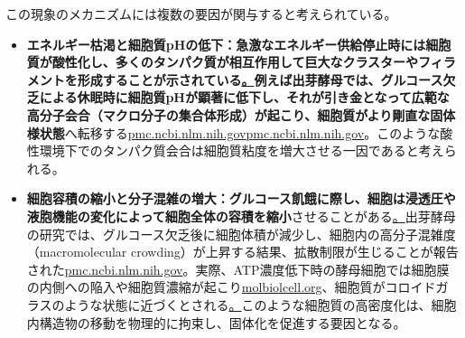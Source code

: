 この現象のメカニズムには複数の要因が関与すると考えられている。

\begin{itemize}
    \item \textbf{エネルギー枯渇と細胞質pHの低下：\textbf{急激なエネルギー供給停止時には細胞質が酸性化し、多くのタンパク質が相互作用して巨大なクラスターやフィラメントを形成することが示されている\href{https://pmc.ncbi.nlm.nih.gov/articles/PMC4850707/\#:~:text=it\%20to\%20be\%20associated\%20with,fluid\%20that\%20can\%20reversibly\%20transition}\href{https://pmc.ncbi.nlm.nih.gov/articles/PMC4850707/\#:~:text=Now\%2C\%20Munder\%20et\%20al,in\%20the\%20cytoplasm\%20becoming\%20stiffer}。例えば出芽酵母では、グルコース欠乏による休眠時に細胞質pHが顕著に低下し、それが引き金となって}広範な高分子会合（マクロ分子の集合体形成）\textbf{が起こり、細胞質が}より剛直な固体様状態}へ転移する\href{https://pmc.ncbi.nlm.nih.gov/articles/PMC4850707/\#:~:text=it\%20to\%20be\%20associated\%20with,fluid\%20that\%20can\%20reversibly\%20transition}{pmc.ncbi.nlm.nih.gov}\href{https://pmc.ncbi.nlm.nih.gov/articles/PMC4850707/\#:~:text=Now\%2C\%20Munder\%20et\%20al,in\%20the\%20cytoplasm\%20becoming\%20stiffer}{pmc.ncbi.nlm.nih.gov}。このような酸性環境下でのタンパク質会合は細胞質粘度を増大させる一因であると考えられる。
    \item \textbf{細胞容積の縮小と分子混雑の増大：\textbf{グルコース飢餓に際し、細胞は浸透圧や液胞機能の変化によって}細胞全体の容積を縮小}させることがある\href{https://pmc.ncbi.nlm.nih.gov/articles/PMC6857596/\#:~:text=organisation,high\%20amounts\%20of\%20carbohydrates\%2C\%20possibly}。出芽酵母の研究では、グルコース欠乏後に細胞体積が減少し、細胞内の高分子混雑度（macromolecular crowding）が上昇する結果、拡散制限が生じることが報告された\href{https://pmc.ncbi.nlm.nih.gov/articles/PMC4811765/\#:~:text=undertakes\%20a\%20startling\%20transition\%20upon,which\%20cells\%20globally\%20alter\%20their}{pmc.ncbi.nlm.nih.gov}。実際、ATP濃度低下時の酵母細胞では細胞膜の内側への陥入や細胞質濃縮が起こり\href{https://www.molbiolcell.org/doi/10.1091/mbc.E20-02-0125\#:~:text=induces\%20a\%20massive\%20reorganization\%20of,a\%20\%E2\%80\%9Csolidification\%E2\%80\%9D\%20of\%20the\%20cytoplasm}{molbiolcell.org}、細胞質がコロイドガラスのような状態に近づくとされる\href{https://pmc.ncbi.nlm.nih.gov/articles/PMC6857596/\#:~:text=organisation,high\%20amounts\%20of\%20carbohydrates\%2C\%20possibly}。このような細胞質の高密度化は、細胞内構造物の移動を物理的に拘束し、固体化を促進する要因となる。

\end{itemize}
